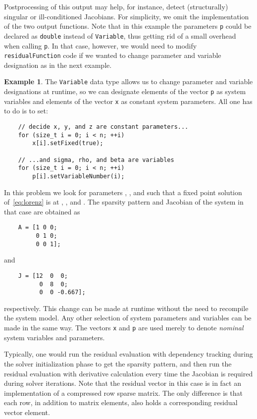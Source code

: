 \documentclass[10pt]{ijnam}
\theoremstyle{definition}
\newtheorem{example}{Example}[section]
\newcommand\xqed[1]{\leavevmode\unskip\penalty9999 \hbox{}\nobreak\hfill \quad\hbox{#1}}
\newcommand{\exampleSymbol}{\xqed{}}
\begin{document}
Postprocessing of this output may help, for instance, detect (structurally) singular or 
ill-conditioned Jacobians. For simplicity, we omit the implementation of the two output functions.
Note that in this example the parameters \texttt{p} could be declared as \texttt{double} instead 
of \texttt{Variable}, thus getting rid of a small overhead when calling \texttt{p}. In that case, 
however, we would need to modify \texttt{residualFunction} code if we wanted to change 
parameter and variable designation as in the next example.

\begin{example}
The \texttt{Variable} data type allows us to change parameter and variable designations at 
runtime, so we can designate elements of the vector \texttt{p} as system variables and elements 
of the vector \texttt{x} as constant system parameters. All one has to do is to set:
\begin{lstlisting}
    // decide x, y, and z are constant parameters... 
    for (size_t i = 0; i < n; ++i)
        x[i].setFixed(true);
        
    // ...and sigma, rho, and beta are variables    
    for (size_t i = 0; i < n; ++i)
        p[i].setVariableNumber(i);
\end{lstlisting}
In this problem we look for parameters , , and  such that a fixed point solution of~\eqref{eq:lorenz} is at , , and . The sparsity pattern and Jacobian of the system in that case are obtained as
\begin{lstlisting}
    A = [1 0 0;
         0 1 0;
         0 0 1];
\end{lstlisting}
and
\begin{lstlisting}
    J = [12  0  0;
          0  8  0;
          0  0 -0.667];
\end{lstlisting}
respectively. This change can be made at runtime without the need to recompile the system model. Any other selection of system parameters and variables can be made in the same way. The vectors \texttt{x} and \texttt{p} are used merely to denote \textit{nominal} system variables and parameters.
\exampleSymbol
\end{example}

Typically, one would run the residual evaluation with dependency tracking during the solver initialization phase
to get the sparsity pattern, and then run the residual evaluation with derivative calculation every time the
Jacobian is required during solver iterations. Note that the residual vector
in this case is in fact an implementation 
of a compressed row sparse matrix. The only difference is that each row, 
in addition to matrix elements, also holds a corresponding residual vector 
element.
\end{document}
